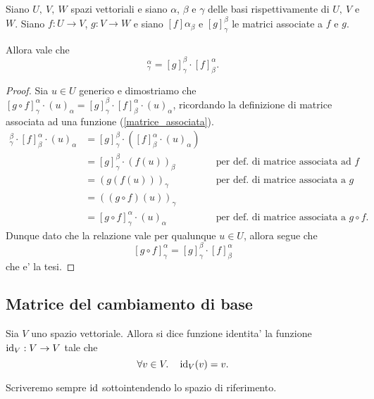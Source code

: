 \begin{theorem}
    Siano $U,\ V,\ W$ spazi vettoriali e siano $\alpha$, $\beta$ e $\gamma$ delle basi rispettivamente di $U,\ V$ e $W$. Siano $f : U \to V$, $g : V \to W$ e siano $[f]{\alpha}_{\beta}$ e $[g]^{\beta}_{\gamma}$ le matrici associate a $f$ e $g$.

    Allora vale che \begin{equation}
        [g \circ f]^{\alpha}_{\gamma} = [g]^{\beta}_{\gamma} \cdot [f]^{\alpha}_{\beta}.
    \end{equation}
\end{theorem}
\begin{proof}
    Sia $u \in U$ generico e dimostriamo che $[g \circ f]^{\alpha}_{\gamma} \cdot (u)_{\alpha} = [g]^{\beta}_{\gamma} \cdot [f]^{\alpha}_{\beta} \cdot (u)_{\alpha}$, ricordando la definizione di matrice associata ad una funzione (\ref{matrice_associata}).
    \begin{align*}
        [g]^{\beta}_{\gamma} \cdot [f]^{\alpha}_{\beta} \cdot (u)_{\alpha} &= [g]^{\beta}_{\gamma} \cdot ([f]^{\alpha}_{\beta} \cdot (u)_{\alpha}) \\
        &= [g]^{\beta}_{\gamma} \cdot (f(u))_{\beta} &&\text{per def. di matrice associata ad $f$}\\
        &= (g(f(u)))_{\gamma} &&\text{per def. di matrice associata a $g$}\\
        &= ((g \circ f)(u))_{\gamma}\\
        &= [g \circ f]^{\alpha}_{\gamma} \cdot (u)_{\alpha} &&\text{per def. di matrice associata a $g \circ f$.}
    \end{align*}
    Dunque dato che la relazione vale per qualunque $u \in U$, allora segue che \[
        [g \circ f]^{\alpha}_{\gamma} = [g]^{\beta}_{\gamma} \cdot [f]^{\alpha}_{\beta}    
    \] che e' la tesi.
\end{proof}

\subsection{Matrice del cambiamento di base}

\begin{definition}
    Sia $V$ uno spazio vettoriale. Allora si dice funzione identita' la funzione $\operatorname{id}_V : V \to V$ tale che \[
        \forall v \in V. \quad \operatorname{id}_V(v) = v.
    \]
\end{definition}

Scriveremo sempre $\operatorname{id}$ sottointendendo lo spazio di riferimento.

